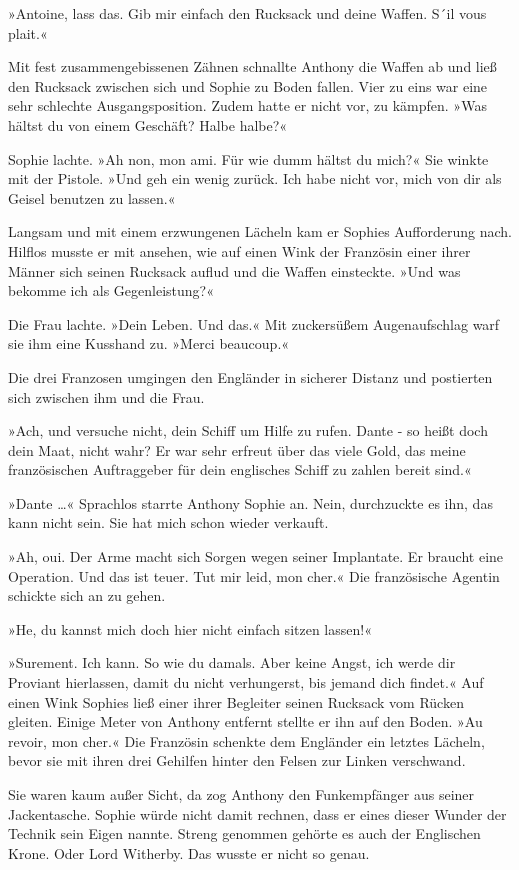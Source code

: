 »Antoine, lass das. Gib mir einfach den Rucksack und deine Waffen.
S´il vous plait.«

Mit fest zusammengebissenen Zähnen schnallte Anthony die Waffen ab
und ließ den Rucksack zwischen sich und Sophie zu Boden fallen.
Vier zu eins war eine sehr schlechte Ausgangsposition. Zudem hatte
er nicht vor, zu kämpfen. »Was hältst du von einem Geschäft? Halbe
halbe?«

Sophie lachte. »Ah non, mon ami. Für wie dumm hältst du mich?« Sie
winkte mit der Pistole. »Und geh ein wenig zurück. Ich habe nicht
vor, mich von dir als Geisel benutzen zu lassen.«

Langsam und mit einem erzwungenen Lächeln kam er Sophies
Aufforderung nach. Hilflos musste er mit ansehen, wie auf einen
Wink der Französin einer ihrer Männer sich seinen Rucksack auflud
und die Waffen einsteckte. »Und was bekomme ich als
Gegenleistung?«

Die Frau lachte. »Dein Leben. Und das.« Mit zuckersüßem
Augenaufschlag warf sie ihm eine Kusshand zu. »Merci beaucoup.«

Die drei Franzosen umgingen den Engländer in sicherer Distanz und
postierten sich zwischen ihm und die Frau.

»Ach, und versuche nicht, dein Schiff um Hilfe zu rufen. Dante - so
heißt doch dein Maat, nicht wahr? Er war sehr erfreut über das
viele Gold, das meine französischen Auftraggeber für dein
englisches Schiff zu zahlen bereit sind.«

»Dante …« Sprachlos starrte Anthony Sophie an. Nein, durchzuckte es
ihn, das kann nicht sein. Sie hat mich schon wieder verkauft.

»Ah, oui. Der Arme macht sich Sorgen wegen seiner Implantate. Er
braucht eine Operation. Und das ist teuer. Tut mir leid, mon cher.«
Die französische Agentin schickte sich an zu gehen.

»He, du kannst mich doch hier nicht einfach sitzen lassen!«

»Surement. Ich kann. So wie du damals. Aber keine Angst, ich werde
dir Proviant hierlassen, damit du nicht verhungerst, bis jemand
dich findet.« Auf einen Wink Sophies ließ einer ihrer Begleiter
seinen Rucksack vom Rücken gleiten. Einige Meter von Anthony
entfernt stellte er ihn auf den Boden. »Au revoir, mon cher.« Die
Französin schenkte dem Engländer ein letztes Lächeln, bevor sie mit
ihren drei Gehilfen hinter den Felsen zur Linken verschwand.

Sie waren kaum außer Sicht, da zog Anthony den Funkempfänger aus
seiner Jackentasche. Sophie würde nicht damit rechnen, dass er
eines dieser Wunder der Technik sein Eigen nannte. Streng genommen
gehörte es auch der Englischen Krone. Oder Lord Witherby. Das
wusste er nicht so genau.

